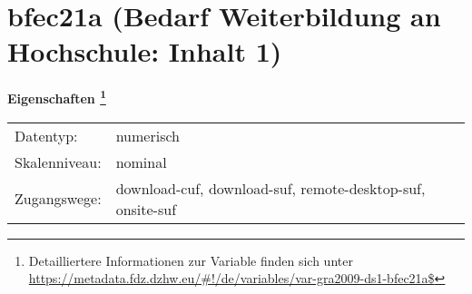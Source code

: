 
    \setcounter{footnote}{0}

    \vspace*{-1.8cm}
	\section{bfec21a (Bedarf Weiterbildung an Hochschule: Inhalt 1)}
	\label{section:bfec21a}



    \vspace*{0.5cm}
    \noindent\textbf{Eigenschaften
	\footnote{Detailliertere Informationen zur Variable finden sich unter
		\url{https://metadata.fdz.dzhw.eu/\#!/de/variables/var-gra2009-ds1-bfec21a$}}}\\
	\begin{tabularx}{\hsize}{@{}lX}
	Datentyp: & numerisch \\
	Skalenniveau: & nominal \\
	Zugangswege: &
	  download-cuf, 
	  download-suf, 
	  remote-desktop-suf, 
	  onsite-suf
 \\
    \end{tabularx}



